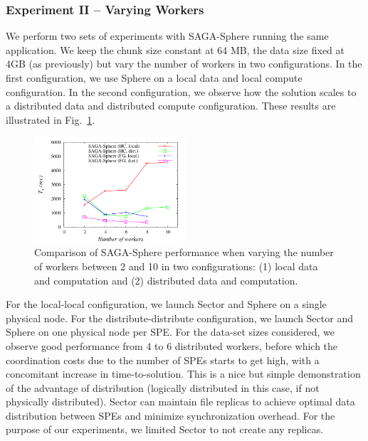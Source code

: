 \documentclass[3p,twocolumn]{elsarticle}
\begin{document}
\subsubsection{Experiment II -- Varying Workers}

We perform two sets of experiments with SAGA-Sphere running the same
\wc application.  We keep the chunk size constant at 64 MB, the data
size fixed at 4GB (as previously) but vary the number of workers in
two configurations. In the first configuration, we use Sphere on a
local data and local compute configuration. In the second
configuration, we observe how the solution scales to a distributed
data and distributed compute configuration. These results are
illustrated in Fig.~\ref{fig:sphere_varying_workers}.

\begin{figure}[htb!]
 \includegraphics[width=0.5\textwidth]{figures/sphere_varying_workers.pdf}
 \caption{
   Comparison of SAGA-Sphere performance when varying the number of workers
   between 2 and 10 in two configurations: (1) local data and computation
   and (2) distributed data and computation.
   \label{fig:sphere_varying_workers}
   }
\end{figure}

For the
local-local configuration, we launch Sector and Sphere on a single
physical node.  For the distribute-distribute configuration, we launch
Sector and Sphere on one physical node per SPE.  For the data-set
sizes considered, we observe good performance from 4 to 6 distributed
workers, before which the coordination costs due to the number of SPEs
starts to get high, with a concomitant increase in
time-to-solution. This is a nice but simple demonstration of the
advantage of distribution (logically distributed in this case, if not
physically distributed). Sector can maintain file replicas to achieve
optimal data distribution between SPEs and minimize synchronization
overhead. For the purpose of our experiments, we limited Sector to not
create any replicas.
\end{document}
